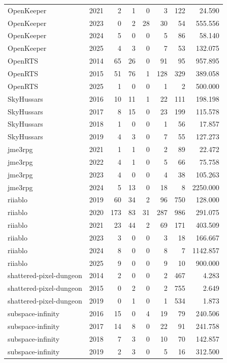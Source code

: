 {\begin{longtable}{lrrrrrrr}
OpenKeeper & 2021 & 2 & 1 & 0 & 3 & 122 & 24.590 \\
OpenKeeper & 2023 & 0 & 2 & 28 & 30 & 54 & 555.556 \\
OpenKeeper & 2024 & 5 & 0 & 0 & 5 & 86 & 58.140 \\
OpenKeeper & 2025 & 4 & 3 & 0 & 7 & 53 & 132.075 \\
OpenRTS & 2014 & 65 & 26 & 0 & 91 & 95 & 957.895 \\
OpenRTS & 2015 & 51 & 76 & 1 & 128 & 329 & 389.058 \\
OpenRTS & 2025 & 1 & 0 & 0 & 1 & 2 & 500.000 \\
SkyHussars & 2016 & 10 & 11 & 1 & 22 & 111 & 198.198 \\
SkyHussars & 2017 & 8 & 15 & 0 & 23 & 199 & 115.578 \\
SkyHussars & 2018 & 1 & 0 & 0 & 1 & 56 & 17.857 \\
SkyHussars & 2019 & 4 & 3 & 0 & 7 & 55 & 127.273 \\
jme3rpg & 2021 & 1 & 1 & 0 & 2 & 89 & 22.472 \\
jme3rpg & 2022 & 4 & 1 & 0 & 5 & 66 & 75.758 \\
jme3rpg & 2023 & 4 & 0 & 0 & 4 & 38 & 105.263 \\
jme3rpg & 2024 & 5 & 13 & 0 & 18 & 8 & 2250.000 \\
riiablo & 2019 & 60 & 34 & 2 & 96 & 750 & 128.000 \\
riiablo & 2020 & 173 & 83 & 31 & 287 & 986 & 291.075 \\
riiablo & 2021 & 23 & 44 & 2 & 69 & 171 & 403.509 \\
riiablo & 2023 & 3 & 0 & 0 & 3 & 18 & 166.667 \\
riiablo & 2024 & 8 & 0 & 0 & 8 & 7 & 1142.857 \\
riiablo & 2025 & 9 & 0 & 0 & 9 & 10 & 900.000 \\
shattered-pixel-dungeon & 2014 & 2 & 0 & 0 & 2 & 467 & 4.283 \\
shattered-pixel-dungeon & 2015 & 0 & 2 & 0 & 2 & 755 & 2.649 \\
shattered-pixel-dungeon & 2019 & 0 & 1 & 0 & 1 & 534 & 1.873 \\
subspace-infinity & 2016 & 15 & 0 & 4 & 19 & 79 & 240.506 \\
subspace-infinity & 2017 & 14 & 8 & 0 & 22 & 91 & 241.758 \\
subspace-infinity & 2018 & 7 & 3 & 0 & 10 & 70 & 142.857 \\
subspace-infinity & 2019 & 2 & 3 & 0 & 5 & 16 & 312.500 \\

\end{longtable}}
